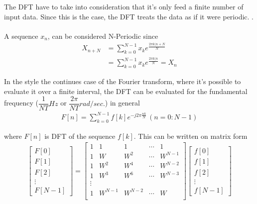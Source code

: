 
The DFT have to take into consideration that it's only feed a finite number of input data. Since this is the case, the DFT treats the data as if it were periodic.
.
\\\\
A sequence $x_n$, can be considered N-Periodic since 
\begin{align*}
	X_{n+N} 
	&= \sum_{k=0}^{N-1}x_k e^{\frac{2 \pi k (n+N}{N}}\\
	&= \sum_{k=0}^{N-1}x_k e^{\frac{2 \pi k (n}{N}} = X_n
\end{align*} 

In the style the continues case of the Fourier transform, where it's possible to evaluate it over a finite interval, the DFT can be evaluated for the fundamental frequency ($\dfrac{1}{NT} Hz$ or $\dfrac{2\pi}{NT}rad/sec.$) in general
\begin{align*}
	F[n] = \sum_{k=0}^{N-1}f[k]e^{-j2\pi\frac{nk}{N}} \, (n = 0: N-1)
\end{align*}

where $F[n]$ is DFT of the sequence $f[k]$.
This can be written on matrix form
\begin{align*}
	\begin{bmatrix}
		F[0]\\ F[1]\\ F[2]\\ \vdots \\ F[N-1]
	\end{bmatrix}
	=
	\begin{bmatrix}
		1 & 1 	& 1   	& \cdots & 1\\
		1 & W 	& W^2 	& \cdots & W^{N-1}\\
		1 & W^2	& W^4	& \cdots & W^{N-2}\\
		1 & W^3	& W^6	& \cdots & W^{N-3}\\
		\vdots\\
		1 & W^{N-1}	& W^{N-2}	& \cdots & W\\
	\end{bmatrix}
	\begin{bmatrix}
		f[0]\\ f[1]\\ f[2]\\ \vdots \\ f[N-1]
	\end{bmatrix}
\end{align*}

